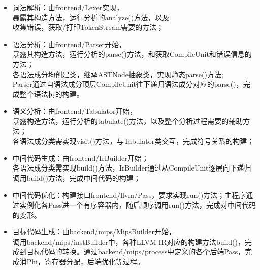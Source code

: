 \begin{itemize}
    \item 词法解析：由frontend/Lexer实现，\\暴露其构造方法，运行分析的analyze()方法，以及\\收集错误，获取/打印TokenStream需要的方法；
    \item 语法分析：由frontend/Parser开始，\\暴露其构造方法，运行分析的parse()方法，和获取CompileUnit和错误信息的方法；\\各语法成分均创建类，继承ASTNode抽象类，实现静态parse()方法;\\Parser通过自语法成分顶层CompileUnit往下递归语法成分对应的parse()，完成整个语法树的构建。
    \item 语义分析：由frontend/Tabulator开始，\\暴露构造方法，运行分析的tabulate()方法，以及整个分析过程需要的辅助方法；\\各语法成分类需实现visit()方法，与Tabulator类交互，完成符号关系的构建；
    \item 中间代码生成：由frontend/IrBuilder开始；\\各语法成分类需实现build()方法，IrBuilder通过从CompileUnit逐层向下递归调用build()方法，完成中间代码的构建；
    \item 中间代码优化：构建接口frontend/llvm/Pass，要求实现run()方法；主程序通过实例化各Pass进一个有序容器内，随后顺序调用run()方法，完成对中间代码的变形。
    \item 目标代码生成：由backend/mips/MipsBuilder开始，\\调用backend/mips/instBuilder中，各种LLVM IR对应的构建方法build()，完成到目标代码的转换。通过backend/mips/process中定义的各个后端Pass，完成消Phi，寄存器分配，后端优化等过程。
\end{itemize}


